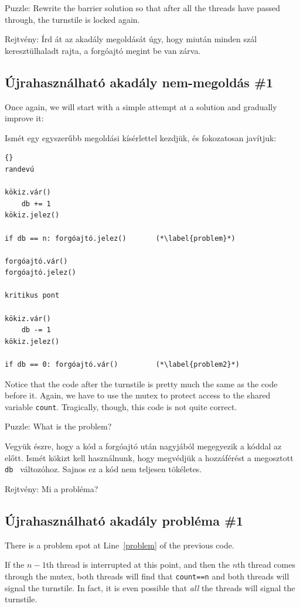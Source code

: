 \documentclass{book}
\newcommand{\clearemptydoublepage}{\newpage\cleardoublepage}
\begin{document}
Puzzle: Rewrite the barrier solution so that after all the threads
have passed through, the turnstile is locked again.

Rejtvény: Írd át az akadály megoldását úgy, hogy miután minden szál
keresztülhaladt rajta, a forgóajtó megint be van zárva.

\clearemptydoublepage
\subsection{Újrahasználható akadály nem-megoldás \#1}

Once again, we will start with a simple attempt at a solution
and gradually improve it:

Ismét egy egyszerűbb megoldási kísérlettel kezdjük, és fokozatosan javítjuk:

\begin{lstlisting}[title={Újrahasználható akadály nem-megoldás}]{}
randevú

kökiz.vár()
    db += 1
kökiz.jelez()

if db == n: forgóajtó.jelez()       (*\label{problem}*)

forgóajtó.vár()
forgóajtó.jelez()

kritikus pont

kökiz.vár()
    db -= 1
kökiz.jelez()

if db == 0: forgóajtó.vár()         (*\label{problem2}*)
\end{lstlisting}

Notice that the code after the turnstile is pretty much the same as
the code before it.  Again, we have to use the mutex to protect access
to the shared variable {\tt count}.
Tragically, though, this code is not quite correct.

Puzzle: What is the problem?

Vegyük észre, hogy a kód a forgóajtó után nagyjából megegyezik a kóddal
az előtt. Ismét kökizt kell használnunk, hogy megvédjük a hozzáférést
a megosztott {\tt db } változóhoz. Sajnos ez a kód nem teljesen tökéletes. 

Rejtvény: Mi a probléma?

\clearemptydoublepage
\subsection{Újrahasználható akadály probléma \#1}

There is a problem spot at Line~\ref{problem} of the previous code.

If the $n-1$th thread is interrupted at this point,
and then the $n$th thread comes through the mutex,
both threads will find that {\tt count==n} and both
threads will signal the turnstile.  In fact, it is even
possible that {\em all} the threads will signal the turnstile.
\end{document}
